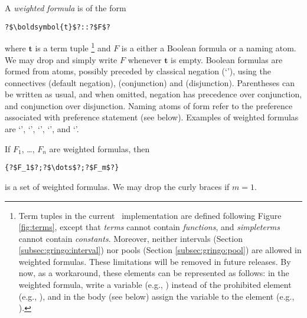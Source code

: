 A \emph{weighted formula} is of the form
\begin{lstlisting}[numbers=none,escapechar=?]
?$\boldsymbol{t}$?::?$F$?
\end{lstlisting}
where $\boldsymbol{t}$ is a term tuple
\footnote{%
Term tuples in the current \asprin\ implementation are defined following Figure \ref{fig:terms}, 
except that \emph{terms} cannot contain \emph{functions}, 
and \emph{simpleterms} cannot contain \emph{constants}. 
Moreover, neither intervals (Section \ref{subsec:gringo:interval}) nor pools  (Section \ref{subsec:gringo:pool})
are allowed in weighted formulas. 
These limitations will be removed in future releases. 
By now, as a workaround, these elements can be represented as follows:
in the weighted formula, write a variable (e.g., ) instead of the prohibited element (e.g., ),  
and in the body (see below) assign the variable to the element (e.g., ).
}
and $F$ is a either a Boolean formula or a naming atom.
We may drop \code{::} and simply write $F$ whenever $\boldsymbol{t}$ is empty.
Boolean formulas are formed from atoms, possibly preceded by classical negation (`\code{-}'),
using the connectives  (default negation), \code{\&} (conjunction) and \code{|} (disjunction).
Parentheses can be written as usual,
and when omitted, negation has precedence over conjunction, and conjunction over disjunction.
%
Naming atoms of form 
refer to the preference associated with preference statement  (see below).
%
Examples of weighted formulas are 
`', 
`', 
`', 
`', and 
`'. 

If $F_1$, \ldots, $F_n$ are weighted formulas, then
\begin{lstlisting}[numbers=none,escapechar=?]
{?$F_1$?;?$\dots$?;?$F_m$?}
\end{lstlisting}
is a set of weighted formulas.
We may drop the curly braces if $m=1$.

